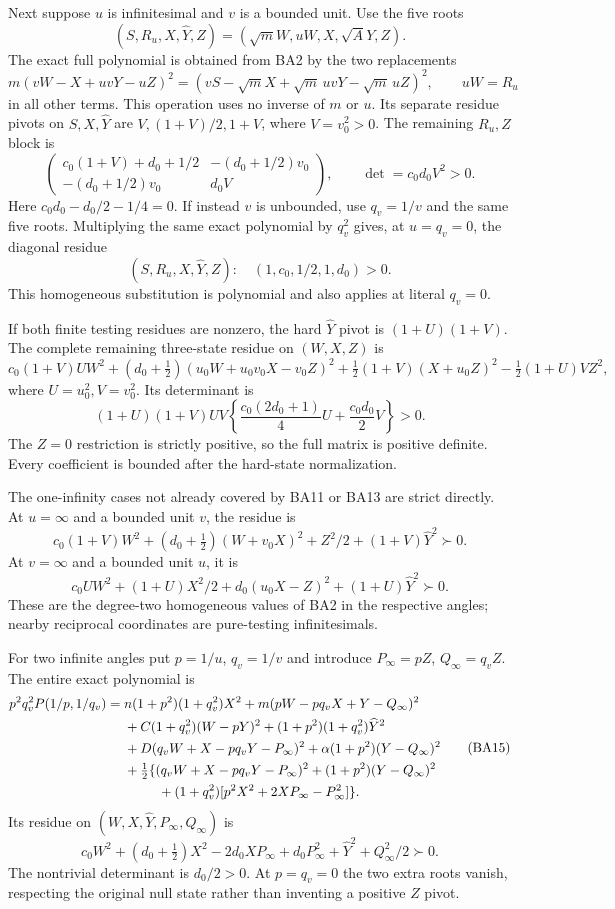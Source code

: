 Next suppose $u$ is infinitesimal and $v$ is a bounded unit.
Use the five roots
\[
 (S,R_u,X,\widehat Y,Z)=(\sqrt mW,uW,X,\sqrt A Y,Z).
\]
The exact full polynomial is obtained from BA2 by the two replacements
\[
 m(vW-X+uvY-uZ)^2=(vS-\sqrt mX+\sqrt m\,uvY-\sqrt m\,uZ)^2,
 \qquad uW=R_u
\]
in all other terms. This operation uses no inverse of $m$ or $u$.
Its separate residue pivots on $S,X,\widehat Y$ are
$V,(1+V)/2,1+V$, where $V=v_0^2>0$. The remaining $R_u,Z$ block is
\[
 \begin{pmatrix}
 c_0(1+V)+d_0+1/2&-(d_0+1/2)v_0\\
 -(d_0+1/2)v_0&d_0V
 \end{pmatrix},\qquad \det=c_0d_0V^2>0.             \tag{BA12}
\]
Here $c_0d_0-d_0/2-1/4=0$. If instead $v$ is unbounded, use
$q_v=1/v$ and the same five roots. Multiplying the same exact
polynomial by $q_v^2$ gives, at $u=q_v=0$, the diagonal residue
\[
 (S,R_u,X,\widehat Y,Z):\quad (1,c_0,1/2,1,d_0)>0.   \tag{BA13}
\]
This homogeneous substitution is polynomial and also applies at
literal $q_v=0$.

If both finite testing residues are nonzero, the hard
$\widehat Y$ pivot is $(1+U)(1+V)$. The complete remaining
three-state residue on $(W,X,Z)$ is
\[
 c_0(1+V)UW^2+(d_0+\tfrac12)(u_0W+u_0v_0X-v_0Z)^2
 +\tfrac12(1+V)(X+u_0Z)^2-\tfrac12(1+U)VZ^2,
\]
where $U=u_0^2,V=v_0^2$. Its determinant is
\[
 (1+U)(1+V)UV\left\{\frac{c_0(2d_0+1)}4U
                              +\frac{c_0d_0}2V\right\}>0.        \tag{BA14}
\]
The $Z=0$ restriction is strictly positive, so the full matrix is
positive definite. Every coefficient is bounded after the hard-state
normalization.

The one-infinity cases not already covered by BA11 or BA13 are
strict directly. At $u=\infty$ and a bounded unit $v$, the residue is
\[
 c_0(1+V)W^2+(d_0+\tfrac12)(W+v_0X)^2+Z^2/2
 +(1+V)\widehat Y^2\succ0.
\]
At $v=\infty$ and a bounded unit $u$, it is
\[
 c_0UW^2+(1+U)X^2/2+d_0(u_0X-Z)^2
 +(1+U)\widehat Y^2\succ0.
\]
These are the degree-two homogeneous values of BA2 in the respective
angles; nearby reciprocal coordinates are pure-testing infinitesimals.

For two infinite angles put $p=1/u$, $q_v=1/v$ and introduce
$P_\infty=pZ$, $Q_\infty=q_vZ$. The entire exact polynomial is
\[
 \begin{split}
 p^2q_v^2P(1/p,1/q_v)={}&n(1+p^2)(1+q_v^2)X^2
 +m(pW-pq_vX+Y-Q_\infty)^2\\
 &+C(1+q_v^2)(W-pY)^2
 +(1+p^2)(1+q_v^2)\widehat Y^2\\
 &+D(q_vW+X-pq_vY-P_\infty)^2
 +\alpha(1+p^2)(Y-Q_\infty)^2\\
 &+\tfrac12\{(q_vW+X-pq_vY-P_\infty)^2
 +(1+p^2)(Y-Q_\infty)^2\\
 &\hspace{9mm}+(1+q_v^2)[p^2X^2+2XP_\infty-P_\infty^2]\}.
 \end{split}                                                       \tag{BA15}
\]
Its residue on $(W,X,\widehat Y,P_\infty,Q_\infty)$ is
\[
 c_0W^2+(d_0+\tfrac12)X^2-2d_0XP_\infty
 +d_0P_\infty^2+\widehat Y^2+Q_\infty^2/2\succ0.
\]
The nontrivial determinant is $d_0/2>0$. At $p=q_v=0$ the two
extra roots vanish, respecting the original null state rather than
inventing a positive $Z$ pivot.

